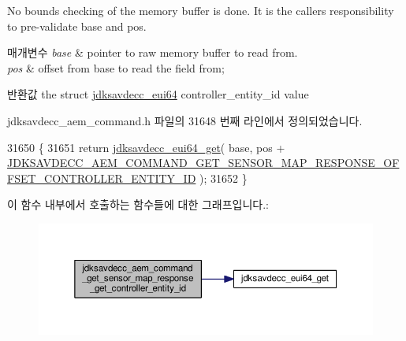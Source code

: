 No bounds checking of the memory buffer is done. It is the caller\textquotesingle{}s responsibility to pre-\/validate base and pos.


\begin{DoxyParams}{매개변수}
{\em base} & pointer to raw memory buffer to read from. \\
\hline
{\em pos} & offset from base to read the field from; \\
\hline
\end{DoxyParams}
\begin{DoxyReturn}{반환값}
the struct \hyperlink{structjdksavdecc__eui64}{jdksavdecc\+\_\+eui64} controller\+\_\+entity\+\_\+id value 
\end{DoxyReturn}


jdksavdecc\+\_\+aem\+\_\+command.\+h 파일의 31648 번째 라인에서 정의되었습니다.


\begin{DoxyCode}
31650 \{
31651     \textcolor{keywordflow}{return} \hyperlink{group__eui64_ga2652311a25a6b91cddbed75c108c7031}{jdksavdecc\_eui64\_get}( base, pos + 
      \hyperlink{group__command__get__sensor__map__response_gad25cd6c17a0b79a25ca90d4d87e9c011}{JDKSAVDECC\_AEM\_COMMAND\_GET\_SENSOR\_MAP\_RESPONSE\_OFFSET\_CONTROLLER\_ENTITY\_ID}
       );
31652 \}
\end{DoxyCode}


이 함수 내부에서 호출하는 함수들에 대한 그래프입니다.\+:
\nopagebreak
\begin{figure}[H]
\begin{center}
\leavevmode
\includegraphics[width=350pt]{group__command__get__sensor__map__response_gaf00b5985c963a5cbbd58151c15bb0aac_cgraph}
\end{center}
\end{figure}


